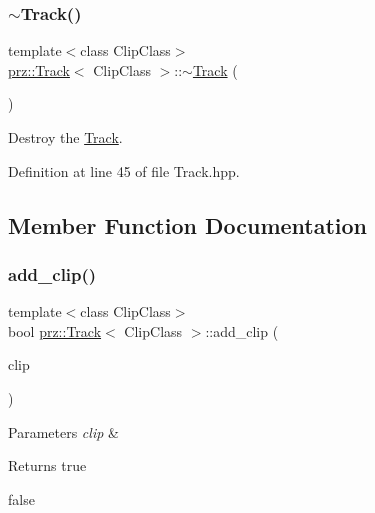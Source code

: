 \subsubsection{\texorpdfstring{$\sim$Track()}{~Track()}}
{\footnotesize\ttfamily template$<$class Clip\+Class$>$ \\
\mbox{\hyperlink{classprz_1_1_track}{prz\+::\+Track}}$<$ Clip\+Class $>$\+::$\sim$\mbox{\hyperlink{classprz_1_1_track}{Track}} (\begin{DoxyParamCaption}{ }\end{DoxyParamCaption})\hspace{0.3cm}{\ttfamily [inline]}}



Destroy the \mbox{\hyperlink{classprz_1_1_track}{Track}}. 



Definition at line 45 of file Track.\+hpp.



\subsection{Member Function Documentation}
\mbox{\label{classprz_1_1_track_aa818d00358690b7dd76ae6e1eb788838}} 
\subsubsection{\texorpdfstring{add\_clip()}{add\_clip()}}
{\footnotesize\ttfamily template$<$class Clip\+Class$>$ \\
bool \mbox{\hyperlink{classprz_1_1_track}{prz\+::\+Track}}$<$ Clip\+Class $>$\+::add\+\_\+clip (\begin{DoxyParamCaption}\item[{Clip\+Class $\ast$}]{clip }\end{DoxyParamCaption})\hspace{0.3cm}{\ttfamily [inline]}}


\begin{DoxyParams}{Parameters}
{\em clip} & \\
\hline
\end{DoxyParams}
\begin{DoxyReturn}{Returns}
true 

false 
\end{DoxyReturn}


